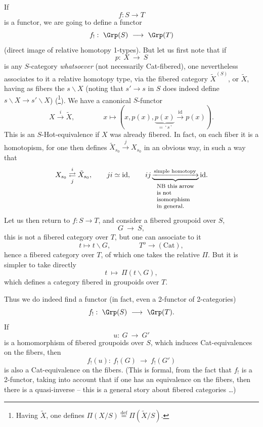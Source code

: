 

If
\[ f : S \longrightarrow T \]
is a functor, we are going to define a functor
\[ f_! :\ \Grp(S) \ \longrightarrow\ \Grp(T) \]
(direct image of relative homotopy 1-types). But let us first note that if
\[ p :\ X \ \longrightarrow\ S \]
is any $S$-category \textit{whatsoever} (not necessarily Cat-fibered), one nevertheless associates to it a relative homotopy type, via the fibered category $\tilde{X}^{(S)}$, or $\tilde{X}$, having as fibers the $s\backslash X$ (noting that $s' \longrightarrow s$ in $S$ does indeed define $s\backslash X \longrightarrow s'\backslash X$) (\footnote{Having $\tilde{X}$, one defines $\Pi(X/S) \overset{\text{def}}{=} \Pi(\tilde{X}/S)$.}). We have a canonical $S$-functor
\[ X \xrightarrow{\ i\ } \tilde{X}, \qquad\qquad x \longmapsto (x, p(x), \underbrace{p(x)}_{=\,\text{‘}\,s\,\text{’}} \xrightarrow{\ \mathrm{id}\ } p(x)). \]
This is an $S$-Hot-equivalence if $X$ was already fibered. In fact, on each fiber it is a homotopism, for one then defines $\tilde{X}_{s_0} \xrightarrow{\ j\ } X_{s_0}$ in an obvious way, in such a way that
\[
X_{s_0} \underset{j}{\overset{i}{\rightleftarrows}} \tilde{X}_{s_0}, \qquad ji \simeq \mathrm{id}, \qquad ij \underbrace{\xrightarrow{\text{simple homotopy}}}_{\text{\footnotesize\begin{tabular}{l}NB this arrow\\ is not \\ isomorphism\\ in general.\end{tabular}}} \mathrm{id}.
\]
Let us then return to $f : S \longrightarrow T$, and consider a fibered groupoid over $S$,
\[ G \ \longrightarrow\ S, \]
this is not a fibered category over $T$, but one can associate to it
\[ t \longmapsto t\backslash G, \qquad\qquad T^o \longrightarrow (\mathrm{Cat}), \]
hence a fibered category over $T$, of which one takes the relative $\Pi$. But it is simpler to take directly
\[ t \ \longmapsto\ \Pi(t\backslash G), \]
which defines a category fibered in groupoids over $T$.

\clearpage



Thus we do indeed find a functor (in fact, even a 2-functor of 2-categories)
\[ f_! :\ \Grp(S) \ \longrightarrow\ \Grp(T). \]
If
\[ u :\ G \ \longrightarrow\ G' \]
is a homomorphism of fibered groupoids over $S$, which induces Cat-equivalences on the fibers, then
\[ f_!(u) :\ f_!(G) \ \longrightarrow\ f_!(G') \]
is also a Cat-equivalence on the fibers. (This is formal, from the fact that $f_!$ is a 2-functor, taking into account that if one has an equivalence on the fibers, then there is a quasi-inverse -- this is a general story about fibered categories \dots)

